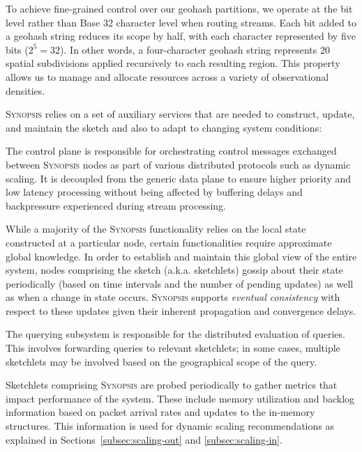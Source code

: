 To achieve fine-grained control over our geohash partitions, we operate at the bit level rather than Base 32 character level when routing streams. Each bit added to a geohash string reduces its scope by half, with each character represented by five bits ($2^5 = 32$). In other words, a four-character geohash string represents 20 spatial subdivisions applied recursively to each resulting region. This property allows us to manage and allocate resources across a variety of observational densities.

\textsc{Synopsis} relies on a set of auxiliary services that are needed to construct, update, and maintain the sketch and also to adapt to changing system conditions:

\begin{description}[leftmargin=*]
	\item[Control plane:] The control plane is responsible for orchestrating control messages exchanged between \textsc{Synopsis} nodes as part of various distributed protocols such as dynamic scaling.
    It is decoupled from the generic data plane to ensure higher priority and low latency processing without being affected by buffering delays and backpressure experienced during stream processing.

	\item[Gossip subsystem:] While a majority of the \textsc{Synopsis} functionality relies on the local state constructed at a particular node, certain functionalities require approximate global knowledge.
        In order to establish and maintain this global view of the entire system, nodes comprising the sketch (a.k.a. sketchlets) gossip about their state periodically (based on time intervals and the number of pending updates) as well as when a change in state occurs.
    \textsc{Synopsis} supports \emph{eventual consistency} with respect to these updates given their inherent propagation and convergence delays.

	\item[Querying subsystem:] The querying subsystem is responsible for the distributed evaluation of queries.
    This involves forwarding queries to relevant sketchlets; in some cases, multiple sketchlets may be involved based on the geographical scope of the query.

    \item[Monitoring subsystem:] Sketchlets comprising \textsc{Synopsis} are probed periodically to gather metrics that impact performance of the system.
    These include memory utilization and backlog information based on packet arrival rates and updates to the in-memory structures.
    This information is used for dynamic scaling recommendations as explained in Sections~\ref{subsec:scaling-out} and \ref{subsec:scaling-in}.
\end{description}
